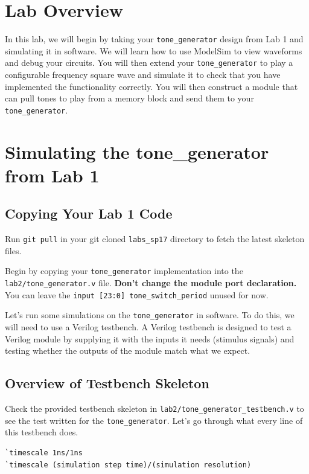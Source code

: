 \documentclass[11pt]{article}
\begin{document}
\section{Lab Overview}

In this lab, we will begin by taking your \verb|tone_generator| design from Lab 1 and simulating it in software. We will learn how to use ModelSim to view waveforms and debug your circuits. You will then extend your \verb|tone_generator| to play a configurable frequency square wave and simulate it to check that you have implemented the functionality correctly. You will then construct a module that can pull tones to play from a memory block and send them to your \verb|tone_generator|.

\section{Simulating the tone\_generator from Lab 1}

\subsection{Copying Your Lab 1 Code}

Run \verb|git pull| in your git cloned \verb|labs_sp17| directory to fetch the latest skeleton files.

Begin by copying your \verb|tone_generator| implementation into the \verb|lab2/tone_generator.v| file. \textbf{Don't change the module port declaration.} You can leave the \verb|input [23:0] tone_switch_period| unused for now.

Let's run some simulations on the \verb|tone_generator| in software. To do this, we will need to use a Verilog testbench. A Verilog testbench is designed to test a Verilog module by supplying it with the inputs it needs (stimulus signals) and testing whether the outputs of the module match what we expect.

\subsection{Overview of Testbench Skeleton}
Check the provided testbench skeleton in \verb|lab2/tone_generator_testbench.v| to see the test written for the \verb|tone_generator|. Let's go through what every line of this testbench does.

\begin{verbatim}
`timescale 1ns/1ns
`timescale (simulation step time)/(simulation resolution)
\end{verbatim}
\end{document}
